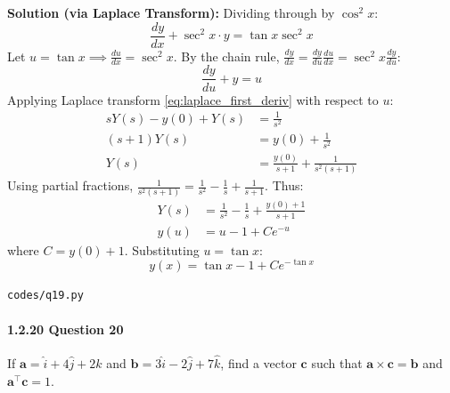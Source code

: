 \documentclass{article}
\begin{document}
\textbf{Solution (via Laplace Transform):} Dividing through by $\cos^2 x$:
\begin{equation}
\frac{dy}{dx} + \sec^2 x \cdot y = \tan x \sec^2 x
\end{equation}
Let $u = \tan x \implies \frac{du}{dx} = \sec^2 x$. By the chain rule, $\frac{dy}{dx} = \frac{dy}{du}\frac{du}{dx} = \sec^2 x \frac{dy}{du}$:
\begin{equation}
\frac{dy}{du} + y = u
\end{equation}
Applying Laplace transform \eqref{eq:laplace_first_deriv} with respect to $u$:
\begin{align}
s Y(s) - y(0) + Y(s) &= \frac{1}{s^2} \\
(s + 1) Y(s) &= y(0) + \frac{1}{s^2} \\
Y(s) &= \frac{y(0)}{s + 1} + \frac{1}{s^2(s+1)}
\end{align}
Using partial fractions, $\frac{1}{s^2(s+1)} = \frac{1}{s^2} - \frac{1}{s} + \frac{1}{s+1}$. Thus:
\begin{align}
Y(s) &= \frac{1}{s^2} - \frac{1}{s} + \frac{y(0) + 1}{s + 1} \\
y(u) &= u - 1 + C e^{-u}
\end{align}
where $C = y(0) + 1$. Substituting $u = \tan x$:
\begin{equation}
y(x) = \tan x - 1 + C e^{-\tan x}
\end{equation}
\begin{tcolorbox}[colback=gray!10,colframe=black,width=\linewidth]
\texttt{codes/q19.py}
\end{tcolorbox}

\paragraph{1.2.20 Question 20}
If $\mathbf{a} = \hat{i} + 4\hat{j} + 2\hat{k}$ and $\mathbf{b} = 3\hat{i} - 2\hat{j} + 7\hat{k}$, find a vector $\mathbf{c}$ such that $\mathbf{a} \times \mathbf{c} = \mathbf{b}$ and $\mathbf{a}^\top \mathbf{c} = 1$.
\end{document}
